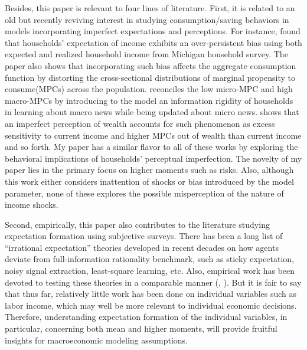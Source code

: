 \documentclass[12pt,notitlepage,onecolumn,aps,pra]{article}
\begin{document}
Besides, this paper is relevant to four lines of literature. First, it
is related to an old but recently reviving interest in studying
consumption/saving behaviors in models incorporating imperfect
expectations and perceptions. For instance,
\cite{rozsypal_overpersistence_2017} found that households' expectation
of income exhibits an over-persistent bias using both expected and
realized household income from Michigan household survey. The paper also
shows that incorporating such bias affects the aggregate consumption
function by distorting the cross-sectional distributions of marginal
propensity to consume(MPCs) across the population.
\cite{carroll_sticky_2018} reconciles the low micro-MPC and high
macro-MPCs by introducing to the model an information rigidity of
households in learning about macro news while being updated about micro
news. \cite{lian2019imperfect} shows that an imperfect perception of
wealth accounts for such phenomenon as excess sensitivity to current
income and higher MPCs out of wealth than current income and so forth.
My paper has a similar flavor to all of these works by exploring the
behavioral implications of households' perceptual imperfection. The
novelty of my paper lies in the primary focus on higher moments such as
risks. Also, although this work either considers inattention of shocks
or bias introduced by the model parameter, none of these explores the
possible misperception of the nature of income shocks.

Second, empirically, this paper also contributes to the literature
studying expectation formation using subjective surveys. There has been
a long list of ``irrational expectation'' theories developed in recent
decades on how agents deviate from full-information rationality
benchmark, such as sticky expectation, noisy signal extraction,
least-square learning, etc. Also, empirical work has been devoted to
testing these theories in a comparable manner (\cite{coibion2012can},
\cite{fuhrer2018intrinsic}). But it is fair to say that thus far,
relatively little work has been done on individual variables such as
labor income, which may well be more relevant to individual economic
decisions. Therefore, understanding expectation formation of the
individual variables, in particular, concerning both mean and higher
moments, will provide fruitful insights for macroeconomic modeling
assumptions.
\end{document}
